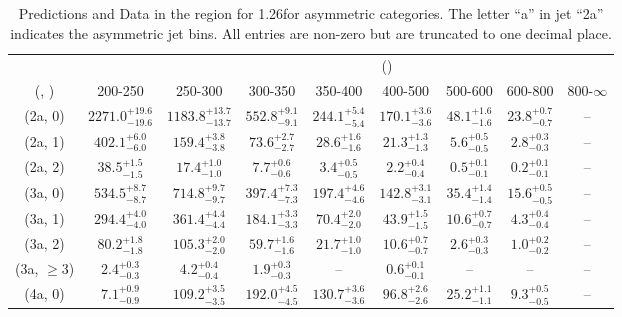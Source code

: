 \begin{table}[h!]
\tiny
\centering
\caption{Predictions and Data in the \mj region for 1.26\ifb for asymmetric categories. The letter ``a'' in jet \eg ``2a''  indicates the asymmetric jet bins. All entries are non-zero but are truncated to one decimal place.\label{tab:yieldsnodatapost_mu_comb_asym}}
\begin{tabular}
{ccccccccc}
	\hline\hline
&	& \multicolumn{8}{c}{\scalht (\gev)} \\ 
	 (\njet,  \nb) & 200-250 & 250-300 & 300-350 & 350-400 & 400-500 & 500-600 & 600-800 & 800-$\infty$ \\ [0.8ex] 
\hline
	(2a, 0) & $2271.0^{+ 19.6 }_{- 19.6 }$ & $1183.8^{+ 13.7 }_{- 13.7 }$ & $552.8^{+ 9.1 }_{- 9.1 }$ & $244.1^{+ 5.4 }_{- 5.4 }$ & $170.1^{+ 3.6 }_{- 3.6 }$ & $48.1^{+ 1.6 }_{- 1.6 }$ & $23.8^{+ 0.7 }_{- 0.7 }$ & -- \\[0.5ex] 
	(2a, 1) & $402.1^{+ 6.0 }_{- 6.0 }$ & $159.4^{+ 3.8 }_{- 3.8 }$ & $73.6^{+ 2.7 }_{- 2.7 }$ & $28.6^{+ 1.6 }_{- 1.6 }$ & $21.3^{+ 1.3 }_{- 1.3 }$ & $5.6^{+ 0.5 }_{- 0.5 }$ & $2.8^{+ 0.3 }_{- 0.3 }$ & -- \\[0.5ex] 
	(2a, 2) & $38.5^{+ 1.5 }_{- 1.5 }$ & $17.4^{+ 1.0 }_{- 1.0 }$ & $7.7^{+ 0.6 }_{- 0.6 }$ & $3.4^{+ 0.5 }_{- 0.5 }$ & $2.2^{+ 0.4 }_{- 0.4 }$ & $0.5^{+ 0.1 }_{- 0.1 }$ & $0.2^{+ 0.1 }_{- 0.1 }$ & -- \\[0.5ex] 
	(3a, 0) & $534.5^{+ 8.7 }_{- 8.7 }$ & $714.8^{+ 9.7 }_{- 9.7 }$ & $397.4^{+ 7.3 }_{- 7.3 }$ & $197.4^{+ 4.6 }_{- 4.6 }$ & $142.8^{+ 3.1 }_{- 3.1 }$ & $35.4^{+ 1.4 }_{- 1.4 }$ & $15.6^{+ 0.5 }_{- 0.5 }$ & -- \\[0.5ex] 
	(3a, 1) & $294.4^{+ 4.0 }_{- 4.0 }$ & $361.4^{+ 4.4 }_{- 4.4 }$ & $184.1^{+ 3.3 }_{- 3.3 }$ & $70.4^{+ 2.0 }_{- 2.0 }$ & $43.9^{+ 1.5 }_{- 1.5 }$ & $10.6^{+ 0.7 }_{- 0.7 }$ & $4.3^{+ 0.4 }_{- 0.4 }$ & -- \\[0.5ex] 
	(3a, 2) & $80.2^{+ 1.8 }_{- 1.8 }$ & $105.3^{+ 2.0 }_{- 2.0 }$ & $59.7^{+ 1.6 }_{- 1.6 }$ & $21.7^{+ 1.0 }_{- 1.0 }$ & $10.6^{+ 0.7 }_{- 0.7 }$ & $2.6^{+ 0.3 }_{- 0.3 }$ & $1.0^{+ 0.2 }_{- 0.2 }$ & -- \\[0.5ex] 
	(3a, $\ge3$) & $2.4^{+ 0.3 }_{- 0.3 }$ & $4.2^{+ 0.4 }_{- 0.4 }$ & $1.9^{+ 0.3 }_{- 0.3 }$ & -- & $0.6^{+ 0.1 }_{- 0.1 }$ & -- & -- & -- \\[0.5ex] 
	(4a, 0) & $7.1^{+ 0.9 }_{- 0.9 }$ & $109.2^{+ 3.5 }_{- 3.5 }$ & $192.0^{+ 4.5 }_{- 4.5 }$ & $130.7^{+ 3.6 }_{- 3.6 }$ & $96.8^{+ 2.6 }_{- 2.6 }$ & $25.2^{+ 1.1 }_{- 1.1 }$ & $9.3^{+ 0.5 }_{- 0.5 }$ & -- \\[0.5ex] 

\end{tabular}
\end{table}
